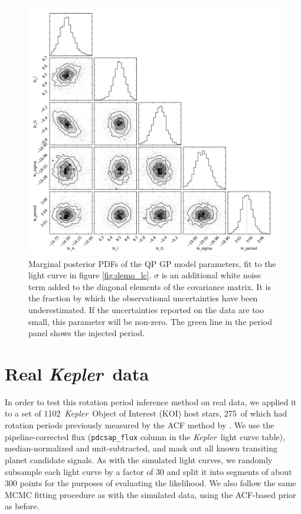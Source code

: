 \documentclass[useAMS, usenatbib, preprint, 12pt]{aastex}
\newcommand{\nkois}{1102}
\newcommand{\nkoimcq}{275}
\newcommand{\Kepler}{{\it Kepler}}
\newcommand{\kepler}{\Kepler}
\begin{document}
\begin{figure}
\begin{center}
\includegraphics[width=6in, clip=true]{figures/25.png}
\caption{Marginal posterior PDFs of the QP GP model parameters, fit to the
    light curve in figure \ref{fig:demo_lc}.
$\sigma$ is an
additional white noise term added to the diagonal elements of the covariance
matrix. It is the fraction by which the observational uncertainties have been
underestimated. If the uncertainties reported on the data are too small, this
parameter will be non-zero.
    The green line in the period panel shows the injected period.}
\label{fig:gp_posteriors}
\end{center}
\end{figure}

\section{Real \kepler\ data}
\label{sec:kepler}

In order to test this rotation period inference method on real data,
we applied it to a set of \nkois\ \Kepler\ Object of Interest (KOI)
host stars, \nkoimcq\ of which had rotation periods previously measured by
the ACF method by \citet{Mcquillan2013}.  We use the pipeline-corrected flux
(\texttt{pdcsap\_flux} column in the \Kepler\ light curve table), median-normalized
and unit-subtracted, and mask out all known transiting planet candidate signals.
As with the simulated light curves, we randomly subsample each
light curve by a factor of 30 and split it into segments of about 300 points
for the purposes of evaluating the likelihood.  We also follow the same MCMC
fitting procedure as with the simulated data, using the ACF-based prior as before.
\end{document}
